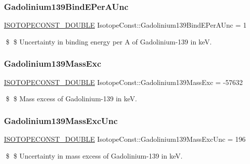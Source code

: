 \subsubsection{\texorpdfstring{Gadolinium139\+Bind\+E\+Per\+A\+Unc}{Gadolinium139BindEPerAUnc}}
{\footnotesize\ttfamily \mbox{\hyperlink{group___isotope_const-_macros_ga8f45a7272ce02c0b4c65c44636ed719a}{I\+S\+O\+T\+O\+P\+E\+C\+O\+N\+S\+T\+\_\+\+D\+O\+U\+B\+LE}} Isotope\+Const\+::\+Gadolinium139\+Bind\+E\+Per\+A\+Unc = 1}

\$ \$ Uncertainty in binding energy per A of Gadolinium-\/139 in keV. \mbox{\label{group___isotope_const-_gadolinium-_gd139_gac3ab76acd3b2954f8ef60635ffe786d0}} 
\subsubsection{\texorpdfstring{Gadolinium139\+Mass\+Exc}{Gadolinium139MassExc}}
{\footnotesize\ttfamily \mbox{\hyperlink{group___isotope_const-_macros_ga8f45a7272ce02c0b4c65c44636ed719a}{I\+S\+O\+T\+O\+P\+E\+C\+O\+N\+S\+T\+\_\+\+D\+O\+U\+B\+LE}} Isotope\+Const\+::\+Gadolinium139\+Mass\+Exc = -\/57632}

\$ \$ Mass excess of Gadolinium-\/139 in keV. \mbox{\label{group___isotope_const-_gadolinium-_gd139_ga205fc0ee9566e4fbbcf188ac9340db13}} 
\subsubsection{\texorpdfstring{Gadolinium139\+Mass\+Exc\+Unc}{Gadolinium139MassExcUnc}}
{\footnotesize\ttfamily \mbox{\hyperlink{group___isotope_const-_macros_ga8f45a7272ce02c0b4c65c44636ed719a}{I\+S\+O\+T\+O\+P\+E\+C\+O\+N\+S\+T\+\_\+\+D\+O\+U\+B\+LE}} Isotope\+Const\+::\+Gadolinium139\+Mass\+Exc\+Unc = 196}

\$ \$ Uncertainty in mass excess of Gadolinium-\/139 in keV. \mbox{\label{group___isotope_const-_gadolinium-_gd139_ga88bde18dd7011a6f496331f9719220d3}} 
